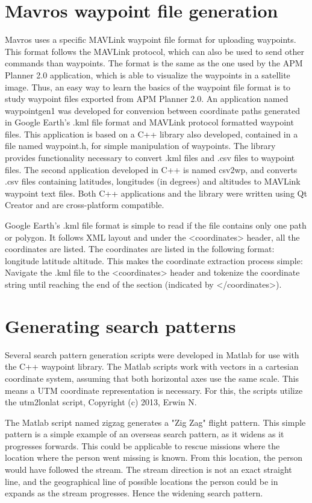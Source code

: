 \section{Mavros waypoint file generation}
\label{waypointgen}
Mavros uses a specific MAVLink waypoint file format for uploading waypoints.
This format follows the MAVLink protocol, which can also be used to send other commands than waypoints.
The format is the same as the one used by the APM Planner 2.0 application,
which is able to visualize the waypoints in a satellite image.
Thus, an easy way to learn the basics of the waypoint file format
is to study waypoint files exported from APM Planner 2.0.
An application named waypointgen1 was developed for conversion between coordinate paths generated
in Google Earth's .kml file format
and MAVLink protocol formatted waypoint files.
This application is based on a C++ library also developed, contained in a file named waypoint.h,
for simple manipulation of waypoints.
The library provides functionality necessary to
convert .kml files and .csv files to waypoint files.
The second application developed in C++ is named csv2wp, and converts .csv files containing
latitudes, longitudes (in degrees) and altitudes to MAVLink waypoint text files.
Both C++ applications and the library were written using Qt Creator and are cross-platform compatible.

Google Earth's .kml file format is simple to read if the file contains only one path or polygon.
It follows XML layout and under the <coordinates> header, all the coordinates are listed.
The coordinates are listed in the following format: longitude latitude altitude.
This makes the coordinate extraction process simple: Navigate the .kml file to the <coordinates>
header and tokenize the coordinate string until reaching the end of the section (indicated by
</coordinates>).

\section{Generating search patterns}
Several search pattern generation scripts were developed in Matlab for use with the C++ waypoint
library.
The Matlab scripts work with vectors in a cartesian coordinate system, assuming that both horizontal axes
use the same scale. This means a UTM coordinate representation is necessary. For this, the scripts
utilize the utm2lonlat script, Copyright (c) 2013, Erwin N.

The Matlab script named zigzag generates a "Zig Zag" flight pattern.
This simple pattern is a simple example of an overseas search pattern, as it widens as it progresses forwards.
This could be applicable to rescue missions where the location where the person went missing is known.
From this location, the person would have followed the stream.
The stream direction is not an exact straight line, and the geographical line of possible locations
the person could be in expands as the stream progresses. Hence the widening search pattern.

